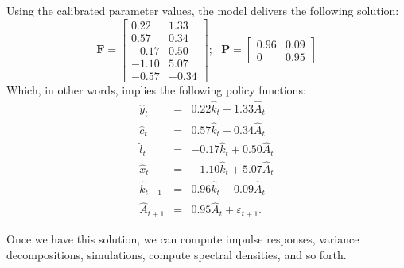 \documentclass[12pt]{article}
\begin{document}
Using the calibrated parameter values, the model delivers the following
solution:%
\begin{equation*}
\mathbf{F=}\left[ 
\begin{array}{cc}
0.22 & 1.33 \\ 
0.57 & 0.34 \\ 
-0.17 & 0.50 \\ 
-1.10 & 5.07 \\ 
-0.57 & -0.34%
\end{array}%
\right] ;\ \ \ \mathbf{P=}\left[ 
\begin{array}{cc}
0.96 & 0.09 \\ 
0 & 0.95%
\end{array}%
\right]
\end{equation*}%
Which, in other words, implies the following policy functions:%
\begin{eqnarray*}
\hat{y}_{t} &=&0.22\hat{k}_{t}+1.33\hat{A}_{t} \\
\hat{c}_{t} &=&0.57\hat{k}_{t}+0.34\hat{A}_{t} \\
\hat{l}_{t} &=&-0.17\hat{k}_{t}+0.50\hat{A}_{t} \\
\hat{x}_{t} &=&-1.10\hat{k}_{t}+5.07\hat{A}_{t} \\
\hat{k}_{t+1} &=&0.96\hat{k}_{t}+0.09\hat{A}_{t} \\
\hat{A}_{t+1} &=&0.95\hat{A}_{t}+\varepsilon _{t+1}.
\end{eqnarray*}

Once we have this solution, we can compute impulse responses, variance
decompositions, simulations, compute spectral densities, and so forth.
\end{document}
